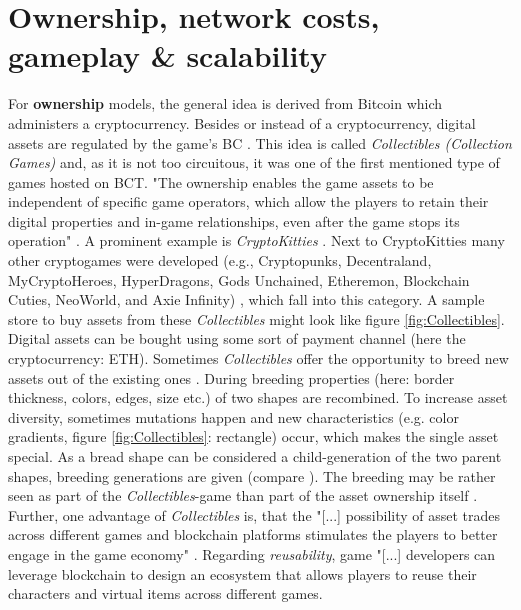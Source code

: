 \section{Ownership,  network costs, gameplay \& scalability}
\label{sec:OwnershipGameplayNetwork}
For \textbf{ownership} models, the general idea is derived from Bitcoin which administers a cryptocurrency.
Besides or instead of a cryptocurrency, digital assets are regulated by the game's \gls{BC} \cite[2]{Pfeiffer.2020}.
This idea is called \textit{Collectibles (Collection Games)} and, as it is not too circuitous,
it was one of the first mentioned type of games hosted on \gls{BCT}.
"The ownership enables the game assets to be independent of specific game operators, which allow the players to retain their digital properties and in-game relationships, even after the game stops its operation" \cite[1]{Min.2019}.
A prominent example is \textit{CryptoKitties} \cite[2]{Pfeiffer.2020}.
Next to CryptoKitties many other cryptogames were developed (e.g., Cryptopunks, Decentraland, MyCryptoHeroes, HyperDragons, Gods Unchained, Etheremon, Blockchain Cuties, NeoWorld, and Axie Infinity) \cite[2]{Serada.2020}, which fall into this category.
A sample store to buy assets from these \textit{Collectibles} might look like figure \ref{fig:Collectibles}.
Digital assets can be bought using some sort of payment channel (here the cryptocurrency: \gls{ETH}).
Sometimes \textit{Collectibles} offer the opportunity to breed new assets out of the existing ones \cite[2]{Serada.2020}.
During breeding properties (here: border thickness, colors, edges, size etc.) of two shapes are recombined.
To increase asset diversity, sometimes mutations happen and new characteristics (e.g. color gradients, figure \ref{fig:Collectibles}: rectangle) occur, which makes the single asset special.
As a bread shape can be considered a child-generation of the two parent shapes, breeding generations are given (compare \cite{CryptoKitties.co.2021}).
The breeding may be rather seen as part of the \textit{Collectibles}-game than part of the asset ownership itself \cite[2]{Pfeiffer.2020}.
Further, one advantage of \textit{Collectibles} is, that the "[...] possibility of asset trades across different games and blockchain platforms stimulates the players to better engage in the game economy" \cite[1]{Min.2019}.
Regarding \textit{reusability}, game "[...] developers can leverage blockchain to design an ecosystem that allows players to reuse their characters and virtual items across different games.
\begin{figure}
\end{figure}
